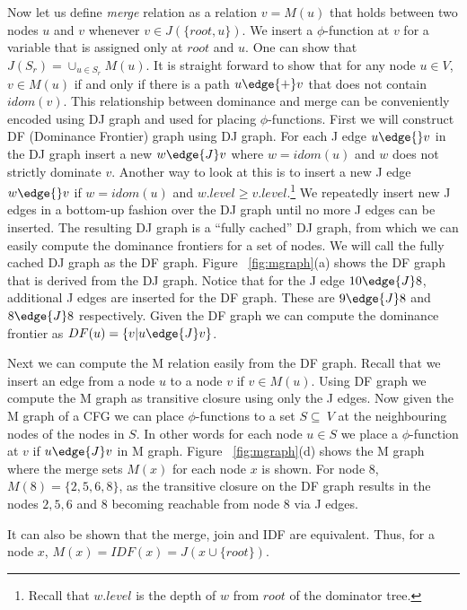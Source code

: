 Now let us define {\em merge} relation as a relation $v=M(u)$
that holds between two nodes $u$ and $v$ whenever
$v \in J(\{root, u\})$. We insert a $\phi$-function at $v$ for a variable that is assigned
only at $root$ and $u$. One can show that $J(S_r) = \cup_{u \in S_r} M(u)$. It is 
straight forward to show that for any node $u \in V$, $v \in M(u)$ if and only if
there is a path $u \edge{+} v$ that does not contain $idom(v)$. This relationship between
dominance and merge can be conveniently encoded using DJ graph and used for placing 
$\phi$-functions. First we will construct DF (Dominance Frontier) graph using DJ graph.
For each J edge $u \edge{} v$ in the DJ graph insert a new  $w \edge{J} v$ where
$w = idom (u)$ and $w$ does not strictly dominate $v$. Another way to
look at this is to insert a new J edge $w \edge{} v$ if $w = idom(u)$ and
$w.level \geq v.level$.\footnote{Recall that $w.level$ is the depth of $w$ from
$root$ of the dominator tree.} We repeatedly insert new J edges in a bottom-up fashion
over the DJ graph until no more J edges can be inserted. The resulting
DJ graph is a ``fully cached'' DJ graph, from which we can easily compute
the dominance frontiers for a set of nodes. We will call the fully cached
DJ graph as the DF graph. Figure ~\ref{fig:mgraph}(a) shows the DF graph
that is derived from the DJ graph. Notice that for the J edge $10 \edge{J} 8$, additional
J edges are inserted for the DF graph. These are $9 \edge{J} 8$ and $8 \edge{J} 8$ respectively.
Given the DF graph we can compute
the dominance frontier as $DF(u) = \{ v | u \edge{J} v\}$.


Next we can compute the M relation easily from the DF graph. 
Recall that  we insert an edge from a node $u$ to
a node $v $ if $v \in M(u)$. Using DF graph we compute
the M graph as transitive closure
using only the J edges. Now given the M graph of
a CFG we can place $\phi$-functions to a set $S \subseteq \ V$ at the neighbouring nodes
of the nodes in $S$. In other words for each node $u \in S$ we place a $\phi$-function
at $v$ if $u \edge{J} v$ in M graph. Figure ~\ref{fig:mgraph}(d) shows the M graph 
where the merge sets $M(x)$ for each node $x$ is shown.
For node 8, $M(8) = \{2,5,6,8\}$, as the transitive closure on the DF graph results in
the nodes $2, 5, 6$ and $8$ becoming reachable from node 8 via J edges. 

It can also be shown that the merge, join and IDF are equivalent. Thus, for a node $x$,
$M(x) = IDF(x) = J(x \cup \{root\})$.


